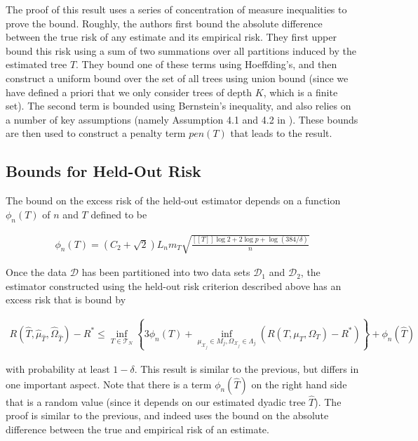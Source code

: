 \documentclass[12pt]{article}
\begin{document}
The proof of this result uses a series of concentration of measure inequalities to prove the bound. Roughly, the authors first bound the absolute difference between the true risk of any estimate and its empirical risk. They first upper bound this risk using a sum of two summations over all partitions induced by the estimated tree $T$. They bound one of these terms using Hoeffding's, and then construct a uniform bound over the set of all trees using union bound (since we have defined a priori that we only consider trees of depth $K$, which is a finite set). The second term is bounded using Bernstein's inequality, and also relies on a number of key assumptions (namely Assumption 4.1 and 4.2 in \cite{liu2010}). These bounds are then used to construct a penalty term $pen(T)$ that leads to the result.

\subsection{Bounds for Held-Out Risk}

The bound on the excess risk of the held-out estimator depends on a function $\phi_n(T)$ of $n$ and $T$ defined to be

\begin{align}
    \phi_n(T) = (C_2 + \sqrt{2}) L_n m_T
    \sqrt{
        \frac{[[T]] \log 2 + 2 \log p + \log(384/\delta)}{n}
    }
\end{align}

Once the data $\mathcal{D}$ has been partitioned into two data sets $\mathcal{D}_1$ and $\mathcal{D}_2$, the estimator constructed using the held-out risk criterion described above has an excess risk that is bound by

\begin{align}
    R(\hat{T}, \hat{\mu}_{\hat{T}}, \hat{\Omega}_{\hat{T}}) - R^*
    \le \underset{T \in \mathcal{T}_N}{\inf}
    \left\{
        3 \phi_n(T) +
        \underset{\mu_{\mathcal{X}_j} \in M_j, \Omega_{\mathcal{X}_j} \in \Lambda_j}{\inf}
        (R(T, \mu_T, \Omega_T) - R^*)
    \right\} + \phi_n (\hat{T})
\end{align}

with probability at least $1 - \delta$. This result is similar to the previous, but differs in one important aspect. Note that there is a term $\phi_n(\hat{T})$ on the right hand side that is a random value (since it depends on our estimated dyadic tree $\hat{T}$). The proof is similar to the previous, and indeed uses the bound on the absolute difference between the true and empirical risk of an estimate.
\end{document}
